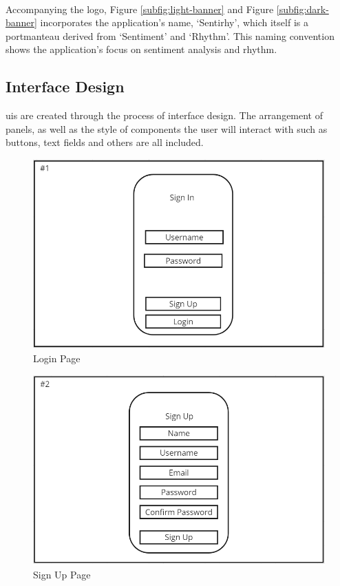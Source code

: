 \\
\indent Accompanying the logo, Figure \ref{subfig:light-banner} and Figure \ref{subfig:dark-banner} incorporates the application's name, `Sentirhy', which itself is a portmanteau derived from `Sentiment' and `Rhythm'.
This naming convention shows the application's focus on sentiment analysis and rhythm.
\\
\subsection{Interface Design}
\gls{ui}s are created through the process of interface design.
The arrangement of panels, as well as the style of components the user will interact with such as buttons, text fields and others are all included.
\begin{figure}[!ht]
    \centering
    \includegraphics[width=12cm]{Images/login.png}
    \caption{Login Page}
    \label{fig:login}
\end{figure}
\begin{figure}[!ht]
    \centering
    \includegraphics[width=12cm]{Images/signup.png}
    \caption{Sign Up Page}
    \label{fig:signup}
\end{figure}

